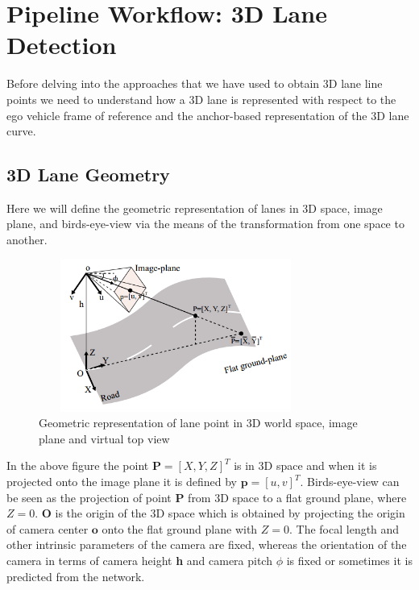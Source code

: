         
        \section{Pipeline Workflow: 3D Lane Detection }
        Before delving into the approaches that we have used to obtain 3D lane line points we need to understand how a 3D lane is represented with respect to the ego vehicle frame of reference and the anchor-based representation of the 3D lane curve.  
        
        \subsection{3D Lane Geometry}
        Here we will define the geometric representation of lanes in 3D space, image plane, and birds-eye-view via the means of the transformation from one space to another. 
        
         \begin{figure}[h]
    \centering
    \includegraphics[width=9cm, height=5cm]{images/3d_lane_geometry.png}
    \caption{Geometric representation of lane point in 3D world space, image plane and virtual top view \cite{DBLP:journals/corr/abs-2112-15351}}
    \end{figure}
    
    In the above figure the point $\textbf{P} =[X, Y, Z]^{T}$ is in 3D space and when it is projected onto the image plane it is defined by $\textbf{p} = [u, v]^{T}$. Birds-eye-view can be seen as the projection of point $\textbf{P}$ from 3D space to a flat ground plane, where $Z=0$. $\textbf{O}$ is the origin of the 3D space which is obtained by projecting the origin of camera center $\textbf{o}$ onto the flat ground plane with $Z = 0$. The focal length and other intrinsic parameters of the camera are fixed, whereas the orientation of the camera in terms of camera height \textbf{h}  and camera pitch \textbf{$\phi$} is fixed or sometimes it is predicted from the network. 
    
